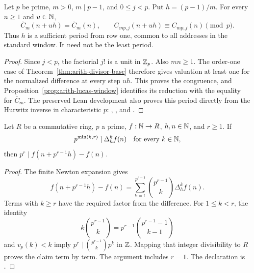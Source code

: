\begin{corollary}
\label{cor:arith-window-period}
Let $p$ be prime, $m>0$, $m\mid p-1$, and $0\le j<p$.  Put
$h=(p-1)/m$.  For every $n\ge1$ and $u\in\mathbb N$,
\[
 \overline C_m(n+uh)=\overline C_m(n),\qquad
 C_{mp,j}(n+uh)\equiv C_{mp,j}(n)\pmod p.
\]
Thus $h$ is a sufficient period from row one, common to all addresses
in the standard window.  It need not be the least period.
\end{corollary}

\begin{proof}
Since $j<p$, the factorial $j!$ is a unit in $\mathbb Z_p$.  Also $mn\ge1$.
The order-one case of Theorem~\ref{thm:arith-divisor-base} therefore gives
valuation at least one for the normalized difference at every step $uh$.
This proves the congruence, and Proposition~\ref{prop:arith-lucas-window}
identifies its reduction with the equality for $\overline C_m$.
The preserved Lean development also proves this period directly from the
Hurwitz inverse in characteristic $p$:
,
, and
.
\end{proof}

\begin{lemma}
\label{lem:arith-newton-period}
Let $R$ be a commutative ring, $p$ a prime, $f:\mathbb N\to R$, $h,n\in\mathbb N$,
and $r\ge1$.  If
\[
 p^{\min(k,r)}\mid\Delta_h^k f(n)\quad\text{for every }k\in\mathbb N,
\]
then $p^r\mid f(n+p^{r-1}h)-f(n)$.
\end{lemma}

\begin{proof}
The finite Newton expansion gives
\[
 f(n+p^{r-1}h)-f(n)
 =\sum_{k=1}^{p^{r-1}}\binom{p^{r-1}}k\Delta_h^k f(n).
\]
Terms with $k\ge r$ have the required factor from the difference.
For $1\le k<r$, the identity
\[
 k\binom{p^{r-1}}k=p^{r-1}\binom{p^{r-1}-1}{k-1}
\]
and $v_p(k)<k$ imply
$p^r\mid\binom{p^{r-1}}k p^k$ in $\mathbb Z$.
Mapping that integer divisibility to $R$ proves the claim term by term.
The argument includes $r=1$.
The declaration is
.
\end{proof}

